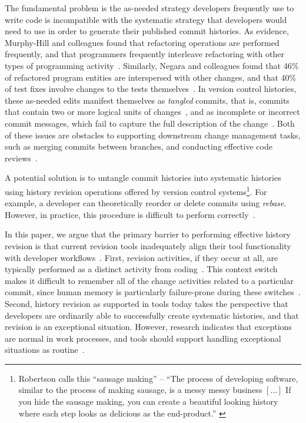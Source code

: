 \documentclass[conference]{IEEEtran}
\newcommand{\purpose}[1]{}
\begin{document}
\purpose{Problem is that strategies are incompatible.} 
The fundamental problem is the as-needed strategy developers frequently use to write code is incompatible with 
the systematic strategy that developers would need to use in order to generate their published commit histories. 
As evidence, Murphy-Hill and colleagues found that refactoring operations are performed frequently, and that programmers 
frequently interleave refactoring with other types of programming activity~\cite{Murphy-Hill2012c}. 
Similarly, Negara and colleagues found that 46\% of refactored program entities are interspersed with other changes, and that 40\% of test fixes involve changes to the tests themselves~\cite{Negara2012}. 
In version control histories, these as-needed edits manifest themselves as \emph{tangled} commits, that is, commits that contain two or more logical units of changes~\cite{Kirinuki2014}, and as incomplete or incorrect commit messages, which fail to capture the full description of the change~\cite{Buse2010,Murphy-Hill2012c}. 
Both of these issues are obstacles to supporting downstream change management tasks, such as merging commits between branches, and conducting effective code reviews~\cite{Kirinuki2014}.

\purpose{History revision gets out of this conflict} 
A potential solution is to untangle commit histories into systematic histories using history revision operations offered by version control systems\footnote{Robertson calls this ``sausage making'' -- ``The process of developing software, 
similar to the process of making sausage, is a messy messy business $[\ldots]$ If you hide the sausage making, 
you can create a beautiful looking history where each step looks as delicious as the end-product.'' 
\cite{SausageMaking}}.
For example, a developer can theoretically reorder or delete commits using \textit{rebase}.
However, in practice, this procedure is difficult to perform correctly~\cite{SausageMaking}.

\purpose{History revisions are not properly supported by tools} 
In this paper, we argue that the primary barrier to performing effective history revision is that current revision tools inadequately align their tool 
functionality with developer workflows~\cite{PerezDeRosso2013}.
First, revision activities, if they occur at all, are typically performed as a distinct activity from coding~\cite{Perry1989}. 
This context switch makes it difficult to remember all of the change activities related to a particular commit, 
since human memory is particularly failure-prone during these switches~\cite{Parnin2012}. 
Second, history revision as supported in tools today takes the perspective that 
developers are ordinarily able to successfully create systematic histories, and that revision is an exceptional situation. However, research indicates that exceptions are normal in work processes, and tools should support handling 
exceptional situations as routine~\cite{Ackerman2000}.
\end{document}

